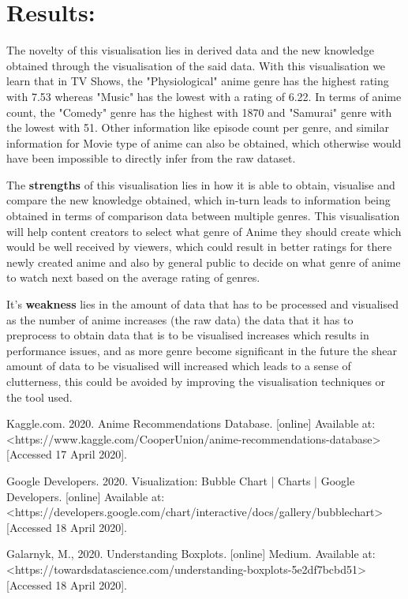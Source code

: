 \documentclass[a4paper, 10pt]{article}
\begin{document}
\section{Results:}
    \qquad The novelty of this visualisation lies in derived data and the new knowledge obtained through the visualisation of the said data. With this visualisation we learn that in TV Shows, the "Physiological" anime genre has the highest rating with 7.53 whereas "Music" has the lowest with a rating of 6.22. In terms of anime count, the "Comedy" genre has the highest with 1870 and "Samurai" genre with the lowest with 51. Other information like episode count per genre, and similar information for Movie type of anime can also be obtained, which otherwise would have been impossible to directly infer from the raw dataset.

    \qquad The \textbf{strengths} of this visualisation lies in how it is able to obtain, visualise and compare the new knowledge obtained, which in-turn leads to information being obtained in terms of comparison data between multiple genres. This visualisation will help content creators to select what genre of Anime they should create which would be well received by viewers, which could result in better ratings for there newly created anime and also by general public to decide on what genre of anime to watch next based on the average rating of genres.
    
    \qquad It's \textbf{weakness} lies in the amount of data that has to be processed and visualised as the number of anime increases (the raw data) the data that it has to preprocess to obtain data that is to be visualised increases which results in performance issues, and as more genre become significant in the future the shear amount of data to be visualised will increased which leads to a sense of clutterness, this could be avoided by improving the visualisation techniques or the tool used. 

\begin{thebibliography}{9}
Kaggle.com. 2020. Anime Recommendations Database. [online] Available at: <https://www.kaggle.com/CooperUnion/anime-recommendations-database> [Accessed 17 April 2020].

Google Developers. 2020. Visualization: Bubble Chart  |  Charts  |  Google Developers. [online] Available at: <https://developers.google.com/chart/interactive/docs/gallery/bubblechart> [Accessed 18 April 2020].

Galarnyk, M., 2020. Understanding Boxplots. [online] Medium. Available at: <https://towardsdatascience.com/understanding-boxplots-5e2df7bcbd51> [Accessed 18 April 2020].

\end{thebibliography}
\end{document}
